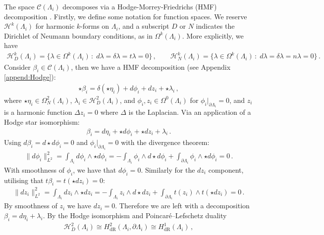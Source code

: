 \documentclass[11pt]{article}
\theoremstyle{plain}
\theoremstyle{definition}
\theoremstyle{remark}
\newcommand{\ST}{\Lambda}
\newcommand{\C}{\mathcal{C} (\ST_i)}
\newcommand{\h}{\mathcal{H}_D^2(\ST_i)}
\begin{document}
The space $\C$ decomposes via a Hodge-Morrey-Friedrichs (HMF) decomposition \cite{schwarz-1995, Gauge_freedom}. Firstly, we define some notation for function spaces. We reserve \(\mathcal{H}^k(\ST_i)\) for harmonic \(k\)-forms on \(\ST_i\), and a subscript \(D\) or \(N\) indicates the Dirichlet of Neumann boundary conditions, as in \( \Omega^k (\ST_i)\). More explicitly, we have
\begin{align*}
    \mathcal{H}^k_D (\ST_i)  = \{   \lambda \in  \Omega^k (\ST_i) \, : \; d \lambda =  \delta \lambda =  t \lambda = 0    \} \, , \qquad \mathcal{H}^k_N (\ST_i)  = \{   \lambda \in  \Omega^k (\ST_i) \, : \; d \lambda =  \delta \lambda =  n \lambda = 0    \} \, . 
\end{align*}
Consider \(\beta _i \in \C\), then we have a HMF decomposition (see Appendix \ref{append:Hodge}):
\begin{align*}
    \star \beta _i = \delta (\star \eta_i) + d \phi_i + dz_i + \star \lambda_i \, , 
\end{align*}
where \(\star \eta_i \in  \Omega_N^2 (\ST_i) \), \(\lambda_i \in \mathcal{H}_D^2(\ST_i)\), and \(\phi_i,z_i \in  \Omega^0 (\ST_i)\) for \(\phi_i|_{\partial \ST_i} = 0\), and \(z_i\) is a harmonic function \(\Delta z_i = 0\) where \(\Delta \) is the Laplacian. Via an application of a Hodge star isomorphism:
\begin{align*}
    \beta _i = d \eta_i + \star d\phi_i + \star dz_i + \lambda_i \, .
\end{align*}
Using \(d \beta _i = d \star d \phi_i = 0\) and \(\phi_i|_{\partial \ST_i} = 0\) with the divergence theorem:
\begin{align*}
    \| d \phi_i \|_{L^2}^2 = \int_{\ST_i}d \phi_i \wedge \star d \phi_i = -  \int_{\ST_i} \phi_i \wedge d \star d \phi_i + \int_{\partial \ST_i} \phi_i \wedge \star d \phi_i = 0 \, .
\end{align*}
With smoothness of \(\phi_i\), we have that \(d \phi_i = 0\). Similarly for the \(dz_i\) component, utilising that \(t \beta _i = t ( \star dz_i ) =0 \):
\begin{align*}
    \| d z_i \|_{L^2}^2 = \int_{\ST_i}d z_i \wedge \star d z_i =  -  \int_{\ST_i} z_i \wedge d \star d z_i + \int_{\partial \ST_i} t(z_i) \wedge t( \star d z_i) = 0 \, . 
\end{align*}
By smoothness of \(z_i\) we have \(dz_i = 0\). Therefore we are left with a decomposition \(\beta _i = d \eta_i + \lambda_i\). By the Hodge isomorphism and Poincaré–Lefschetz duality
\begin{align*}
    \h \cong H^2_{\mathrm{dR}} ( \ST_i, \partial \ST_i) \cong H^1_{\mathrm{dR}} ( \ST_i)  \, ,
\end{align*}
\end{document}
